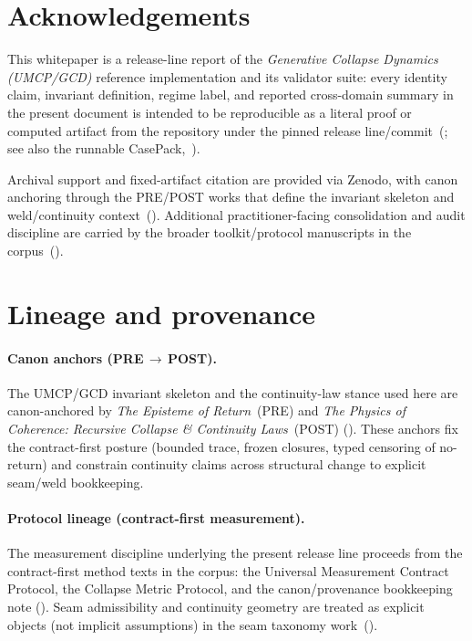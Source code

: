 \documentclass[
  aps,
  prd,
  preprint,
  superscriptaddress,
  nofootinbib,
  floatfix
]{revtex4-2}
\begin{document}

\section*{Acknowledgements}

This whitepaper is a release-line report of the
\textit{Generative Collapse Dynamics (UMCP/GCD)} reference
implementation and its validator suite: every identity claim,
invariant definition, regime label, and reported cross-domain
summary in the present document is intended to be reproducible
as a literal proof or computed artifact from the repository
under the pinned release
line/commit~(\cite{umcpmetadatarepo}; see also the runnable
CasePack,~\cite{paulus2026umcpcasepack}).

Archival support and fixed-artifact citation are provided via
Zenodo, with canon anchoring through the PRE/POST works that
define the invariant skeleton and weld/continuity
context~(\cite{paulus2025episteme,paulus2025physicscoherence}).
Additional practitioner-facing consolidation and audit
discipline are carried by the broader toolkit/protocol
manuscripts in the
corpus~(\cite{paulus2025toolkit,paulus2025umcp,paulus2025cmp,paulus2025canonnote}).


\section*{Lineage and provenance}

\paragraph{Canon anchors (PRE\,$\rightarrow$\,POST).}
The UMCP/GCD invariant skeleton and the continuity-law
stance used here are canon-anchored by \textit{The Episteme
of Return}~(PRE) and \textit{The Physics of Coherence:
Recursive Collapse \& Continuity Laws}~(POST)
(\cite{paulus2025episteme,paulus2025physicscoherence}).
These anchors fix the contract-first posture (bounded trace,
frozen closures, typed censoring of no-return) and constrain
continuity claims across structural change to explicit
seam/weld bookkeeping.

\paragraph{Protocol lineage (contract-first measurement).}
The measurement discipline underlying the present release
line proceeds from the contract-first method texts in the
corpus: the Universal Measurement Contract Protocol, the
Collapse Metric Protocol, and the canon/provenance
bookkeeping note
(\cite{paulus2025umcp,paulus2025cmp,paulus2025canonnote}).
Seam admissibility and continuity geometry are treated as
explicit objects (not implicit assumptions) in the seam
taxonomy work~(\cite{paulus2025seams}).
\end{document}
